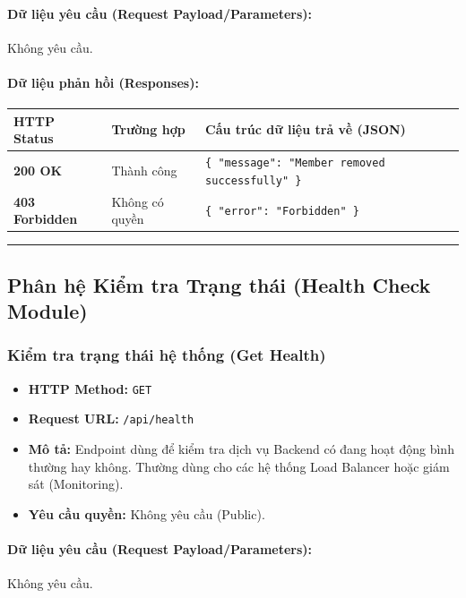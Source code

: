 \documentclass[12pt,a4paper]{article}
\begin{document}
\paragraph{Dữ liệu yêu cầu (Request Payload/Parameters):}
Không yêu cầu.\\

\paragraph{Dữ liệu phản hồi (Responses):}
\begin{longtable}{|p{2.8cm}|p{3.2cm}|p{8.0cm}|}
\hline
\textbf{HTTP Status} & \textbf{Trường hợp} & \textbf{Cấu trúc dữ liệu trả về (JSON)} \\ \hline
\endhead
\textbf{200 OK} & Thành công & \texttt{\{ "message": "Member removed successfully" \}} \\ \hline
\textbf{403 Forbidden} & Không có quyền & \texttt{\{ "error": "Forbidden" \}} \\ \hline
\end{longtable}

\vskip 0.4cm
\noindent\rule{\textwidth}{0.3pt}
\vskip 0.4cm

\subsection{Phân hệ Kiểm tra Trạng thái (Health Check Module)}

\subsubsection{Kiểm tra trạng thái hệ thống (Get Health)}
\begin{itemize}[leftmargin=*]
    \item \textbf{HTTP Method:} \texttt{GET}
    \item \textbf{Request URL:} \texttt{/api/health}
    \item \textbf{Mô tả:} Endpoint dùng để kiểm tra dịch vụ Backend có đang hoạt động bình thường hay không. Thường dùng cho các hệ thống Load Balancer hoặc giám sát (Monitoring).
    \item \textbf{Yêu cầu quyền:} Không yêu cầu (Public).
\end{itemize}

\paragraph{Dữ liệu yêu cầu (Request Payload/Parameters):}
Không yêu cầu.\\
\end{document}
